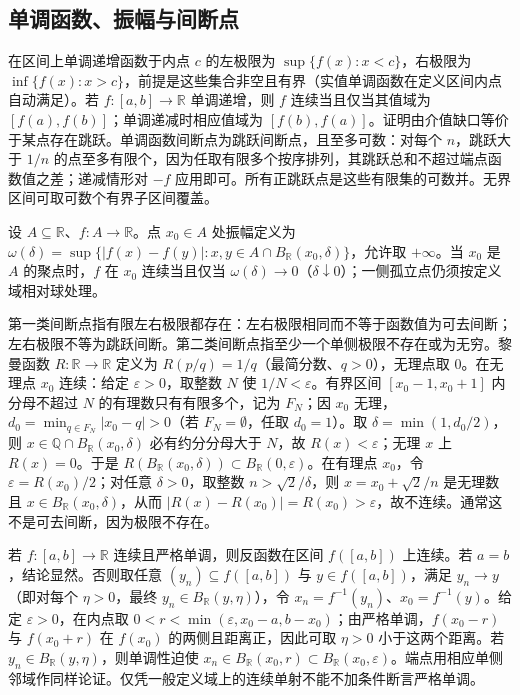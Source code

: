 \documentclass[11pt,a4paper,UTF8]{ctexart}
\theoremstyle{definition}\newtheorem{definition}[theorem]{定义}
\theoremstyle{remark}\newtheorem{remark}[theorem]{说明}
\begin{document}
\subsection{单调函数、振幅与间断点}
在区间上单调递增函数于内点 $c$ 的左极限为 $\sup\{f(x):x<c\}$，右极限为 $\inf\{f(x):x>c\}$，前提是这些集合非空且有界（实值单调函数在定义区间内点自动满足）。若 $f:[a,b]\to\mathbb R$ 单调递增，则 $f$ 连续当且仅当其值域为 $[f(a),f(b)]$；单调递减时相应值域为 $[f(b),f(a)]$。证明由介值缺口等价于某点存在跳跃。单调函数间断点为跳跃间断点，且至多可数：对每个 $n$，跳跃大于 $1/n$ 的点至多有限个，因为任取有限多个按序排列，其跳跃总和不超过端点函数值之差；递减情形对 $-f$ 应用即可。所有正跳跃点是这些有限集的可数并。无界区间可取可数个有界子区间覆盖。

设 $A\subseteq\mathbb R$、$f:A\to\mathbb R$。点 $x_0\in A$ 处振幅定义为 $\omega(\delta)=\sup\{|f(x)-f(y)|:x,y\in A\cap B_{\mathbb R}(x_0,\delta)\}$，允许取 $+\infty$。当 $x_0$ 是 $A$ 的聚点时，$f$ 在 $x_0$ 连续当且仅当 $\omega(\delta)\to0$（$\delta\downarrow0$）；一侧孤立点仍须按定义域相对球处理。

第一类间断点指有限左右极限都存在：左右极限相同而不等于函数值为可去间断；左右极限不等为跳跃间断。第二类间断点指至少一个单侧极限不存在或为无穷。黎曼函数 $R:\mathbb R\to\mathbb R$ 定义为 $R(p/q)=1/q$（最简分数、$q>0$），无理点取 $0$。在无理点 $x_0$ 连续：给定 $\varepsilon>0$，取整数 $N$ 使 $1/N<\varepsilon$。有界区间 $[x_0-1,x_0+1]$ 内分母不超过 $N$ 的有理数只有有限多个，记为 $F_N$；因 $x_0$ 无理，$d_0=\min_{q\in F_N}|x_0-q|>0$（若 $F_N=\emptyset$，任取 $d_0=1$）。取 $\delta=\min(1,d_0/2)$，则 $x\in\mathbb Q\cap B_{\mathbb R}(x_0,\delta)$ 必有约分分母大于 $N$，故 $R(x)<\varepsilon$；无理 $x$ 上 $R(x)=0$。于是 $R(B_{\mathbb R}(x_0,\delta))\subset B_{\mathbb R}(0,\varepsilon)$。在有理点 $x_0$，令 $\varepsilon=R(x_0)/2$；对任意 $\delta>0$，取整数 $n>\sqrt2/\delta$，则 $x=x_0+\sqrt2/n$ 是无理数且 $x\in B_{\mathbb R}(x_0,\delta)$，从而 $|R(x)-R(x_0)|=R(x_0)>\varepsilon$，故不连续。通常这不是可去间断，因为极限不存在。

若 $f:[a,b]\to\mathbb R$ 连续且严格单调，则反函数在区间 $f([a,b])$ 上连续。若 $a=b$，结论显然。否则取任意 $(y_n)\subseteq f([a,b])$ 与 $y\in f([a,b])$，满足 $y_n\to y$（即对每个 $\eta>0$，最终 $y_n\in B_{\mathbb R}(y,\eta)$），令 $x_n=f^{-1}(y_n)$、$x_0=f^{-1}(y)$。给定 $\varepsilon>0$，在内点取 $0<r<\min(\varepsilon,x_0-a,b-x_0)$；由严格单调，$f(x_0-r)$ 与 $f(x_0+r)$ 在 $f(x_0)$ 的两侧且距离正，因此可取 $\eta>0$ 小于这两个距离。若 $y_n\in B_{\mathbb R}(y,\eta)$，则单调性迫使 $x_n\in B_{\mathbb R}(x_0,r)\subset B_{\mathbb R}(x_0,\varepsilon)$。端点用相应单侧邻域作同样论证。仅凭一般定义域上的连续单射不能不加条件断言严格单调。
\end{document}
